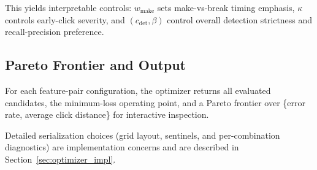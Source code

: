 This yields interpretable controls: $w_{\mathrm{make}}$ sets make-vs-break timing emphasis, $\kappa$ controls early-click severity, and $(c_{\mathrm{det}},\beta)$ control overall detection strictness and recall-precision preference.

\subsection{Pareto Frontier and Output}
For each feature-pair configuration, the optimizer returns all evaluated candidates, the minimum-loss operating point, and a Pareto frontier over \{error rate, average click distance\} for interactive inspection.

Detailed serialization choices (grid layout, sentinels, and per-combination diagnostics) are implementation concerns and are described in Section~\ref{sec:optimizer_impl}.
